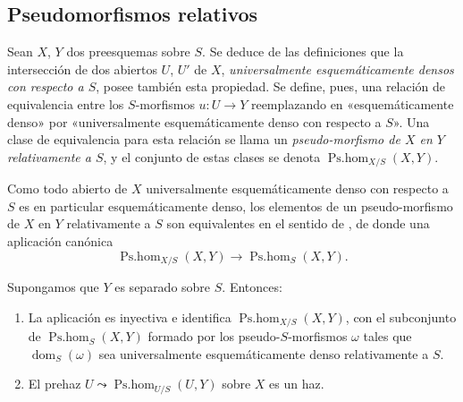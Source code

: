 \subsection{Pseudomorfismos relativos}
\label{IV.20.5}

\begin{env}[20.5.1]
\label{IV.20.5.1}
Sean $X$, $Y$ dos preesquemas sobre $S$.
Se deduce de las definiciones  que la intersección de dos abiertos $U$, $U'$ de $X$, \emph{universalmente esquemáticamente densos con respecto a $S$}, posee también esta propiedad.
Se define, pues, una relación de equivalencia entre los $S$-morfismos $u:U\to Y$ reemplazando en  «esquemáticamente denso» por «universalmente esquemáticamente denso con respecto a $S$».
Una clase de equivalencia para esta relación se llama un \emph{pseudo-morfismo de $X$ en $Y$ relativamente a $S$}, y el conjunto de estas clases se denota $\operatorname{Ps.hom}_{X/S}(X,Y)$.
\end{env}

\begin{env}[20.5.2]
\label{IV.20.5.2}
Como todo abierto de $X$ universalmente esquemáticamente denso con respecto a $S$ es en particular esquemáticamente denso, los elementos de un pseudo-morfismo
de $X$ en $Y$ relativamente a $S$ son equivalentes en el sentido de , de donde una aplicación canónica
\[
\label{IV.20.5.2.1}
  \operatorname{Ps.hom}_{X/S}(X,Y)\to\operatorname{Ps.hom}_S(X,Y).
  \tag{20.5.2.1}
\]
\end{env}

\begin{proposition}[20.5.3]
\label{IV.20.5.3}
Supongamos que $Y$ es separado sobre $S$.
Entonces:
\begin{enumerate}[label=\emph{(\roman*)}]
  \item La aplicación  es inyectiva e identifica $\operatorname{Ps.hom}_{X/S}(X,Y)$, con el subconjunto de $\operatorname{Ps.hom}_S(X,Y)$ formado por los pseudo-$S$-morfismos $\omega$ tales que $\operatorname{dom}_S(\omega)$ sea universalmente esquemáticamente denso relativamente a $S$.
  \item El prehaz $U\leadsto\operatorname{Ps.hom}_{U/S}(U,Y)$ sobre $X$ es un haz.
\end{enumerate}
\end{proposition}

